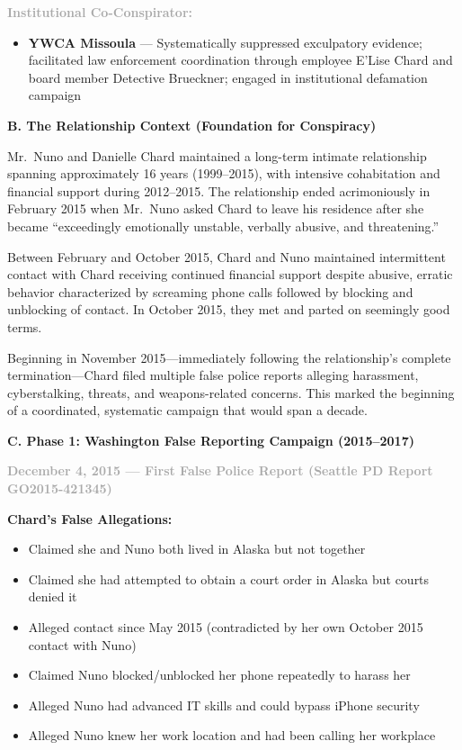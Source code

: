 \documentclass[11pt, letterpaper]{article}
\newcommand{\subsectiontitle}[1]{\vspace{0.15in}\noindent\textcolor{NavyBlue}{\textbf{#1}}\vspace{0.05in}}
\newcommand{\subsubsectiontitle}[1]{\vspace{0.1in}\noindent\textcolor{DarkGray}{\textbf{#1}}\vspace{0.05in}}
\begin{document}
\subsubsectiontitle{Institutional Co-Conspirator:}
\begin{itemize}[leftmargin=*,itemsep=2pt]
    \item \textbf{YWCA Missoula} --- Systematically suppressed exculpatory evidence; facilitated law enforcement coordination through employee E'Lise Chard and board member Detective Brueckner; engaged in institutional defamation campaign
\end{itemize}

\subsectiontitle{B. The Relationship Context (Foundation for Conspiracy)}

Mr.\ Nuno and Danielle Chard maintained a long-term intimate relationship spanning approximately 16 years (1999--2015), with intensive cohabitation and financial support during 2012--2015. The relationship ended acrimoniously in February 2015 when Mr.\ Nuno asked Chard to leave his residence after she became ``exceedingly emotionally unstable, verbally abusive, and threatening.''

Between February and October 2015, Chard and Nuno maintained intermittent contact with Chard receiving continued financial support despite abusive, erratic behavior characterized by screaming phone calls followed by blocking and unblocking of contact. In October 2015, they met and parted on seemingly good terms.

Beginning in November 2015---immediately following the relationship's complete termination---Chard filed multiple false police reports alleging harassment, cyberstalking, threats, and weapons-related concerns. This marked the beginning of a coordinated, systematic campaign that would span a decade.

\subsectiontitle{C. Phase 1: Washington False Reporting Campaign (2015--2017)}

\subsubsectiontitle{December 4, 2015 --- First False Police Report (Seattle PD Report GO2015-421345)}

\textbf{Chard's False Allegations:}
\begin{itemize}[leftmargin=*,itemsep=2pt]
    \item Claimed she and Nuno both lived in Alaska but not together
    \item Claimed she had attempted to obtain a court order in Alaska but courts denied it
    \item Alleged contact since May 2015 (contradicted by her own October 2015 contact with Nuno)
    \item Claimed Nuno blocked/unblocked her phone repeatedly to harass her
    \item Alleged Nuno had advanced IT skills and could bypass iPhone security
    \item Alleged Nuno knew her work location and had been calling her workplace
\end{itemize}
\end{document}
